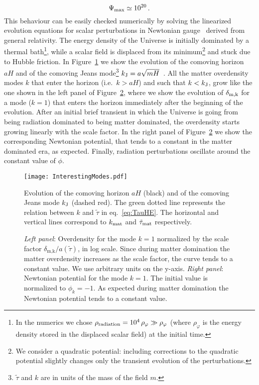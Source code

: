 \documentclass[11pt,a4paper]{article}
\begin{document}
\begin{equation}
\label{eq:MaxEnhancement}
\Psi_{\rm max} \simeq 10^{20}\,.
\end{equation}
This behaviour can be easily checked numerically by solving the linearized evolution equations for scalar perturbations in Newtonian gauge~\cite{Mukhanov:1990me} derived from general relativity. The energy density of the Universe is initially dominated by a thermal bath\footnote{In the numerics we chose $\rho_{\rm radiation} = 10^4 \, \rho_{\varphi} \gg \rho_{\varphi}$ (where $\rho_{\varphi}$ is the energy density stored in the displaced scalar field) at the initial time.}, while a scalar field is displaced from its minimum\footnote{We consider a quadratic potential: including corrections to the quadratic potential slightly changes only the transient evolution of the perturbations.} and stuck due to Hubble friction. In Figure~\ref{fig:InterestingModes} we show the evolution of the comoving horizon $a H$ and of the comoving Jeans mode\footnote{$\tilde\tau$ and $k$ are in units of the mass of the field $m$.} $k_{\rm J} = a \sqrt{m H}$~\cite{Gorbunov:2011zzc}. All the matter overdensity modes $k$ that enter the horizon (i.e.~$k > a H$) and such that $k < k_{\rm J}$, grow like the one shown in the left panel of Figure~\ref{fig:OverD}, where we show the evolution of $\delta_{\rm m,k}$ for a mode ($k = 1$) that enters the horizon immediately after the beginning of the evolution. After an initial brief transient in which the Universe is going from being radiation dominated to being matter dominated, the overdensity starts growing linearly with the scale factor. In the right panel of Figure~\ref{fig:OverD} we show the corresponding Newtonian potential, that tends to a constant in the matter dominated era, as expected. Finally, radiation perturbations oscillate around the constant value of $\phi$.\\

\begin{figure}
\texttt{[image: InterestingModes.pdf]}
\caption{Evolution of the comoving horizon $a H$ (black) and of the comoving Jeans mode $k_{\rm J}$ (dashed red). The green dotted line represents the relation between $k$ and $\tilde{\tau}$ in eq.~\eqref{eq:TauHE}. The horizontal and vertical lines correspond to $k_{\rm mat}$ and $\tilde{\tau}_{\rm mat}$ respectively.}
\label{fig:InterestingModes}
\end{figure}

\begin{figure}
\hfill
{}
\caption{\textit{Left panel}: Overdensity for the mode $k=1$ normalized by the scale factor $\delta_{\text{m,k}}/a(\tilde{\tau})$, in log scale. Since during matter domination the matter overdensity increases as the scale factor, the curve tends to a constant value. We use arbitrary units on the y-axis. \textit{Right panel}: Newtonian potential for the mode $k=1$. The initial value is normalized to $\phi_k = -1$. As expected during matter domination the Newtonian potential tends to a constant value.}
\label{fig:OverD}
\end{figure}
\end{document}
